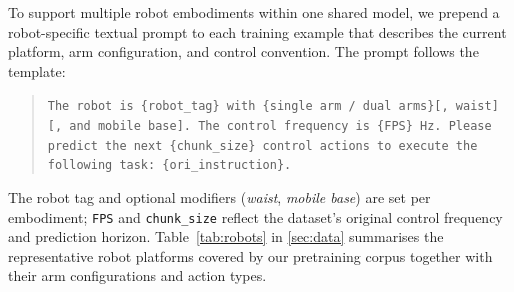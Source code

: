 \label{sec:embodiment}

To support multiple robot embodiments within one shared model, we prepend a
robot-specific textual prompt to each training example that describes the
current platform, arm configuration, and control convention.
The prompt follows the template:

\begin{quote}
\texttt{The robot is \{robot\_tag\} with \{single arm / dual arms\}[, waist][, and mobile base].
The control frequency is \{FPS\} Hz.
Please predict the next \{chunk\_size\} control actions to execute the following task: \{ori\_instruction\}.}
\end{quote}

\noindent The robot tag and optional modifiers (\emph{waist}, \emph{mobile base}) are set per
embodiment; \texttt{FPS} and \texttt{chunk\_size} reflect the dataset's original control
frequency and prediction horizon.
Table~\ref{tab:robots} in \cref{sec:data} summarises the representative robot
platforms covered by our pretraining corpus together with their arm
configurations and action types.
